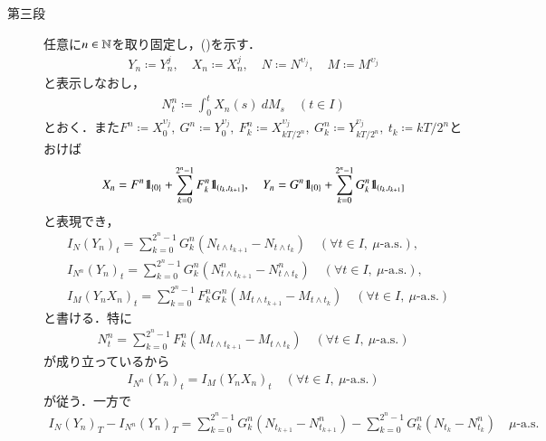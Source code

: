 \begin{prf}
\begin{description}
			\item[第三段]
				任意に$n \in \mathbb{N}$を取り固定し，()を示す．
				\begin{align}
					Y_n \coloneqq Y_n^j,
					\quad X_n \coloneqq X_n^j,
					\quad N \coloneqq N^{\upsilon_j},
					\quad M \coloneqq M^{\upsilon_j}
				\end{align}
				と表示しなおし，
				\begin{align}
					N^n_t \coloneqq \int_0^t X_n(s)\ d M_s
					\quad (t \in I)
				\end{align}
				とおく．また$F^n \coloneqq X^{\upsilon_j}_0,\ G^n \coloneqq Y^{\upsilon_j}_0,\ 
				F^n_k \coloneqq X^{\upsilon_j}_{kT/2^n},\ G^n_k \coloneqq Y^{\upsilon_j}_{kT/2^n},\ t_k \coloneqq kT/2^n$とおけば
				\begin{align}
					X_n = F^n \mbox{1}\hspace{-0.25em}\mbox{l}_{\{0\}} + \sum_{k=0}^{2^n-1} F^n_k \mbox{1}\hspace{-0.25em}\mbox{l}_{\left( t_k, t_{k+1} \right]},
					\quad Y_n = G^n \mbox{1}\hspace{-0.25em}\mbox{l}_{\{0\}} + \sum_{k=0}^{2^n-1} G^n_k \mbox{1}\hspace{-0.25em}\mbox{l}_{\left( t_k, t_{k+1} \right]}
				\end{align}
				と表現でき，
				\begin{align}
					&I_{N} (Y_n)_t = \sum_{k=0}^{2^n-1} G^n_k \left( N_{t \wedge t_{k+1}} - N_{t \wedge t_k} \right) \quad (\forall t \in I,\ \mbox{$\mu$-a.s.}), \\
					&I_{N^n} (Y_n)_t = \sum_{k=0}^{2^n-1} G^n_k \left( N^n_{t \wedge t_{k+1}} - N^n_{t \wedge t_k} \right) \quad (\forall t \in I,\ \mbox{$\mu$-a.s.}), \\
					&I_{M} (Y_n X_n)_t = \sum_{k=0}^{2^n-1} F^n_k G^n_k \left( M_{t \wedge t_{k+1}} - M_{t \wedge t_k} \right) \quad (\forall t \in I,\ \mbox{$\mu$-a.s.})
				\end{align}
				と書ける．特に
				\begin{align}
					N^n_t = \sum_{k=0}^{2^n-1} F^n_k \left( M_{t \wedge t_{k+1}} - M_{t \wedge t_k} \right) \quad (\forall t \in I,\ \mbox{$\mu$-a.s.})
				\end{align}
				が成り立っているから
				\begin{align}
					I_{N^n} (Y_n)_t = I_{M} (Y_n X_n)_t \quad (\forall t \in I,\ \mbox{$\mu$-a.s.})
					\label{eq:Ito-Integral_on_M_c_loc_report_7_4}
				\end{align}
				が従う．一方で
				\begin{align}
					I_{N} (Y_n)_T - I_{N^n} (Y_n)_T
					= \sum_{k=0}^{2^n-1} G^n_k \left( N_{t_{k+1}} - N^n_{t_{k+1}} \right) -  \sum_{k=0}^{2^n-1} G^n_k \left( N_{t_k} - N^n_{t_k} \right) 
					\quad \mbox{$\mu$-a.s.}

\end{align}
\end{description}
\end{prf}
